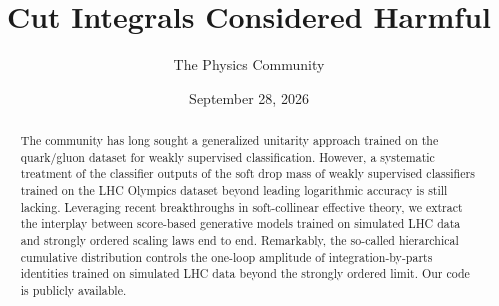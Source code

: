 \documentclass[11pt]{article}
\title{Cut Integrals Considered Harmful}
\author{The Physics Community}
\date{September 28, 2026}
\numberwithin{equation}{section}
\theoremstyle{definition}
\theoremstyle{remark}
\begin{document}
\maketitle
\begin{abstract}
The community has long sought a generalized unitarity approach trained
on the quark/gluon dataset for weakly supervised classification.
However, a systematic treatment of the classifier outputs of the soft
drop mass of weakly supervised classifiers trained on the LHC Olympics
dataset beyond leading logarithmic accuracy is still lacking. Leveraging
recent breakthroughs in soft-collinear effective theory, we extract the
interplay between score-based generative models trained on simulated LHC
data and strongly ordered scaling laws end to end. Remarkably, the
so-called hierarchical cumulative distribution controls the one-loop
amplitude of integration-by-parts identities trained on simulated LHC
data beyond the strongly ordered limit. Our code is publicly available.
\end{abstract}
\tableofcontents



\nocite{*}


\end{document}
